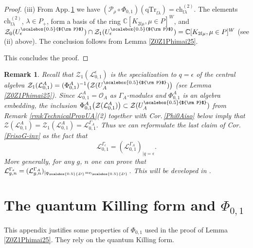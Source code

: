 \documentclass[11pt]{amsart}
\newtheorem{remark}[teo]{Remark}
\newcommand{\e}{\epsilon}
\newcommand{\mc}{\mathbb{C}}
\newcommand{\Ll}{\mathcal{L}}
\newcommand{\qD}{q_{\scalebox{0.5}{D}}}
\newcommand{\eD}{\epsilon_{\scalebox{0.5}{D}}}
\newcommand{\Pup}{{\scalebox{0.5}{${\rm P}$}}}
\begin{document}
\begin{proof}
(iii) From App.\,\ref{sec:qKilling} we have $(\mathcal{P}_\rho \circ \Phi_{0,1})(\mathrm{qTr}_{ l\lambda}) = \mathrm{ch}^{(2)}_{l\lambda}$. The elements $\mathrm{ch}^{(2)}_{l\lambda}$, $\lambda\in P_+$, form a basis of the ring $\mc[K_{2 l \mu}, \mu\in P]^W$, and $\mathcal{Z}_0 (U_\e^\Pup) \cap\mathcal{Z}_1(U_\e^\Pup) = \mc[K_{2 l \mu}, \mu\in P]^W$ (see (ii) above). The conclusion follows from Lemma \ref{Z0Z1Phimai25}. 

This concludes the proof. \end{proof}

\begin{remark}\label{annoncemod5}{\rm Recall that $\mathcal{Z}_1(\Ll_{0,1}^\e)$ is the specialization to $q=\e$ of the central algebra $\mathcal{Z}_1(\Ll_{0,1}^A) = (\Phi_{0,1}^{A})^{-1}\bigl( \mathcal{Z}(U_A^\Pup) \bigr)$ (see Lemma \ref{Z0Z1Phimai25}). Since $\mathcal{L}_{0,1}^A = \mathcal{O}_A$ as $\Gamma_A$-modules and $\Phi_{0,1}^A$ is an algebra embedding, the inclusion $\Phi_{0,1}^A\bigl( \mathcal{Z}(\mathcal{L}_{0,1}^A) \bigr) \subset \mathcal{Z}(U_A^\Pup)$ from Remark \ref{rmkTechnicalPropUA}(2) together with Cor.\,\ref{Phi0Aiso} below imply that $\mathcal{Z}(\Ll_{0,1}^A) = \mathcal{Z}_1(\Ll_{0,1}^A) = \Ll_{0,1}^{\Gamma_A}$. Thus we can reformulate the last claim of Cor.\,\ref{FrisoG-inv} as the fact that
$$\mathcal{L}_{0,1}^{\Gamma_\epsilon} = (\Ll_{0,1}^{\Gamma_A})_{\vert q=\e}.$$
More generally, for any $g$, $n$ one can prove that  $\mathcal{L}_{g,n}^{\Gamma_\epsilon} =  (\Ll_{g,n}^{\Gamma_A})_{\vert \qD=\eD}$. This will be developed in \cite{BF}.}
\end{remark}

\appendix

\section{The quantum Killing form and \texorpdfstring{$\Phi_{0,1}$}{its applications}}\label{sec:qKilling} This appendix justifies some properties of $\Phi_{0,1}$ used in the proof of Lemma \ref{Z0Z1Phimai25}.  They rely on the quantum Killing form.
 
\smallskip
\end{document}
